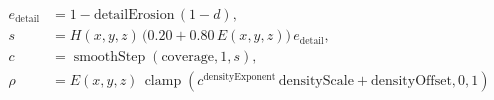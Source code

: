 \documentclass[border=6pt]{standalone}
\begin{document}
\color{white}
\(\displaystyle
\begin{aligned}
e_{\mathrm{detail}} &= 1-\mathrm{detailErosion}\,(1-d),\\
s &= H(x,y,z)\,\bigl(0.20+0.80\,E(x,y,z)\bigr)\,e_{\mathrm{detail}},\\
c &= \operatorname{smoothStep}(\mathrm{coverage},1,s),\\
\rho &= E(x,y,z)\,
\operatorname{clamp}\!\left(c^{\mathrm{densityExponent}}\,
\mathrm{densityScale}+\mathrm{densityOffset},0,1\right)
\end{aligned}
\)
\end{document}
